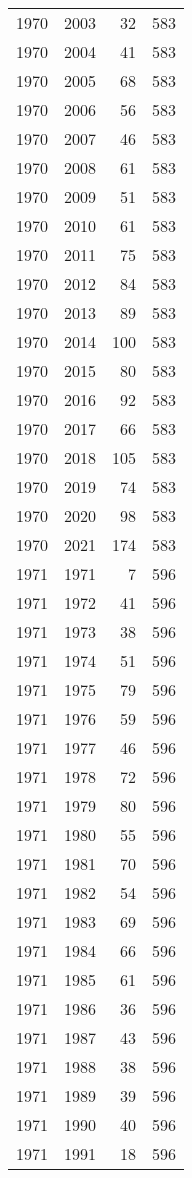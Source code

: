 \documentclass[
  10pt,
  letterpaper,
  DIV=11,
  numbers=noendperiod,
  twoside]{scrartcl}
\begin{document}
\begin{longtable}[]{@{}rrrr@{}}
1970 & 2003 & 32 & 583 \\
1970 & 2004 & 41 & 583 \\
1970 & 2005 & 68 & 583 \\
1970 & 2006 & 56 & 583 \\
1970 & 2007 & 46 & 583 \\
1970 & 2008 & 61 & 583 \\
1970 & 2009 & 51 & 583 \\
1970 & 2010 & 61 & 583 \\
1970 & 2011 & 75 & 583 \\
1970 & 2012 & 84 & 583 \\
1970 & 2013 & 89 & 583 \\
1970 & 2014 & 100 & 583 \\
1970 & 2015 & 80 & 583 \\
1970 & 2016 & 92 & 583 \\
1970 & 2017 & 66 & 583 \\
1970 & 2018 & 105 & 583 \\
1970 & 2019 & 74 & 583 \\
1970 & 2020 & 98 & 583 \\
1970 & 2021 & 174 & 583 \\
1971 & 1971 & 7 & 596 \\
1971 & 1972 & 41 & 596 \\
1971 & 1973 & 38 & 596 \\
1971 & 1974 & 51 & 596 \\
1971 & 1975 & 79 & 596 \\
1971 & 1976 & 59 & 596 \\
1971 & 1977 & 46 & 596 \\
1971 & 1978 & 72 & 596 \\
1971 & 1979 & 80 & 596 \\
1971 & 1980 & 55 & 596 \\
1971 & 1981 & 70 & 596 \\
1971 & 1982 & 54 & 596 \\
1971 & 1983 & 69 & 596 \\
1971 & 1984 & 66 & 596 \\
1971 & 1985 & 61 & 596 \\
1971 & 1986 & 36 & 596 \\
1971 & 1987 & 43 & 596 \\
1971 & 1988 & 38 & 596 \\
1971 & 1989 & 39 & 596 \\
1971 & 1990 & 40 & 596 \\
1971 & 1991 & 18 & 596 \\

\end{longtable}
\end{document}

